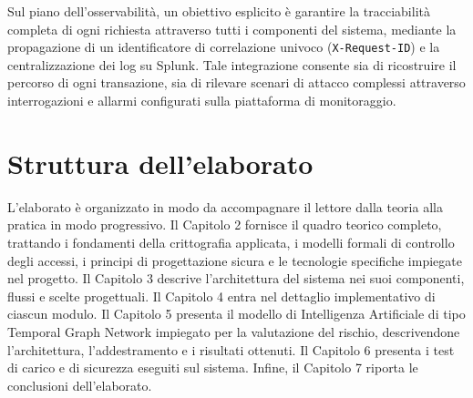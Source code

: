Sul piano dell'osservabilità, un obiettivo esplicito è garantire la tracciabilità completa di ogni richiesta attraverso tutti i componenti del sistema, mediante la propagazione di un identificatore di correlazione univoco (\texttt{X-Request-ID}) e la centralizzazione dei log su Splunk. Tale integrazione consente sia di ricostruire il percorso di ogni transazione, sia di rilevare scenari di attacco complessi attraverso interrogazioni e allarmi configurati sulla piattaforma di monitoraggio.


\section{Struttura dell'elaborato}

L'elaborato è organizzato in modo da accompagnare il lettore dalla teoria alla pratica in modo progressivo. Il Capitolo 2 fornisce il quadro teorico completo, trattando i fondamenti della crittografia applicata, i modelli formali di controllo degli accessi, i principi di progettazione sicura e le tecnologie specifiche impiegate nel progetto. Il Capitolo 3 descrive l'architettura del sistema nei suoi componenti, flussi e scelte progettuali. Il Capitolo 4 entra nel dettaglio implementativo di ciascun modulo. Il Capitolo 5 presenta il modello di Intelligenza Artificiale di tipo Temporal Graph Network impiegato per la valutazione del rischio, descrivendone l'architettura, l'addestramento e i risultati ottenuti. Il Capitolo 6 presenta i test di carico e di sicurezza eseguiti sul sistema. Infine, il Capitolo 7 riporta le conclusioni dell'elaborato.
